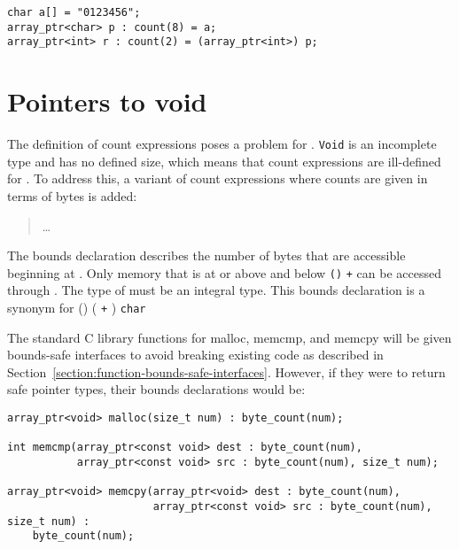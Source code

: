 \begin{verbatim}
char a[] = "0123456";
array_ptr<char> p : count(8) = a;
array_ptr<int> r : count(2) = (array_ptr<int>) p;
\end{verbatim}

\section{Pointers to void}
\label{section:pointers-to-void}

The definition of count expressions poses a problem for
\arrayptrvoid. \texttt{Void} is an
incomplete type and has no defined size, which means that count
expressions are ill-defined for
\arrayptrvoid. To address this, a
variant of count expressions where counts are given in terms of bytes is
added:


\begin{quote}
\ldots{}

\end{quote}

The bounds declaration 
describes the number of bytes that are accessible beginning at . 
Only memory that is at or above  and below \texttt{(\arrayptrchar)}
 \texttt{+}  can be accessed through . The type
of  must be an integral type. This bounds declaration is a synonym for 
           {
                      {(\arrayptrchar) ( \texttt{+} )}
                      {\texttt{char}}}

The standard C library functions for malloc, memcmp, and memcpy will be
given bounds-safe interfaces to avoid breaking existing code as
described in Section~\ref{section:function-bounds-safe-interfaces}. 
However, if they were to return safe pointer
types, their bounds declarations would be:

\begin{verbatim}
array_ptr<void> malloc(size_t num) : byte_count(num);

int memcmp(array_ptr<const void> dest : byte_count(num),
           array_ptr<const void> src : byte_count(num), size_t num);

array_ptr<void> memcpy(array_ptr<void> dest : byte_count(num),
                       array_ptr<const void> src : byte_count(num), size_t num) :
    byte_count(num);
\end{verbatim}

